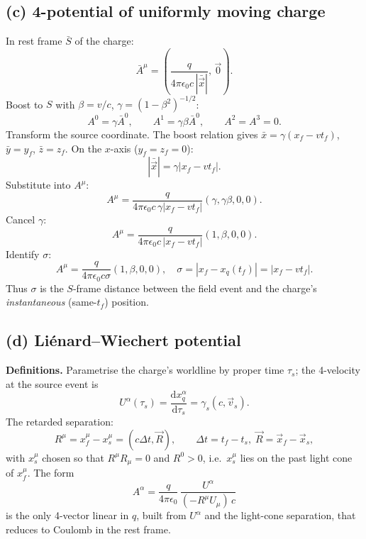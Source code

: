 \documentclass[11pt]{article}
\newcommand{\de}{\mathrm{d}}
\begin{document}
\subsection*{(c) 4-potential of uniformly moving charge}

In rest frame $\bar S$ of the charge:
\[ \bar A^{\mu}=\left(\frac{q}{4\pi\epsilon_{0}c\,|\bar{\vec x}|},\,\vec 0\right). \]
Boost to $S$ with $\beta=v/c$, $\gamma=(1-\beta^{2})^{-1/2}$:
\[ A^{0}=\gamma\bar A^{0},\qquad A^{1}=\gamma\beta\bar A^{0},\qquad A^{2}=A^{3}=0. \]
Transform the source coordinate. The boost relation gives $\bar x=\gamma(x_{f}-vt_{f})$, $\bar y=y_{f}$, $\bar z=z_{f}$. On the $x$-axis ($y_{f}=z_{f}=0$):
\[ |\bar{\vec x}|=\gamma|x_{f}-vt_{f}|. \]
Substitute into $A^{\mu}$:
\[ A^{\mu}=\frac{q}{4\pi\epsilon_{0}c\,\gamma|x_{f}-vt_{f}|}(\gamma,\gamma\beta,0,0). \]
Cancel $\gamma$:
\[ A^{\mu}=\frac{q}{4\pi\epsilon_{0}c\,|x_{f}-vt_{f}|}(1,\beta,0,0). \]
Identify $\sigma$:
\begin{equation}
\boxed{\;A^{\mu}=\frac{q}{4\pi\epsilon_{0}c\sigma}(1,\beta,0,0),\quad \sigma=|x_{f}-x_{q}(t_{f})|=|x_{f}-vt_{f}|.\;}
\end{equation}
Thus $\sigma$ is the $S$-frame distance between the field event and the charge's \emph{instantaneous} (same-$t_{f}$) position.

\subsection*{(d) Li{\'e}nard--Wiechert potential}

\textbf{Definitions.} Parametrise the charge's worldline by proper time $\tau_{s}$; the 4-velocity at the source event is
\[ U^{\alpha}(\tau_{s})=\frac{\de x_{q}^{\alpha}}{\de\tau_{s}}=\gamma_{s}(c,\vec v_{s}). \]
The retarded separation:
\[ R^{\mu}=x_{f}^{\mu}-x_{s}^{\mu}=(c\Delta t,\vec R),\qquad \Delta t=t_{f}-t_{s},\;\vec R=\vec x_{f}-\vec x_{s}, \]
with $x_{s}^{\mu}$ chosen so that $R^{\mu}R_{\mu}=0$ and $R^{0}>0$, i.e.\ $x_{s}^{\mu}$ lies on the past light cone of $x_{f}^{\mu}$. The form
\[ A^{\alpha}=\frac{q}{4\pi\epsilon_{0}}\,\frac{U^{\alpha}}{(-R^{\mu}U_{\mu})\,c} \]
is the only 4-vector linear in $q$, built from $U^{\alpha}$ and the light-cone separation, that reduces to Coulomb in the rest frame.
\end{document}
